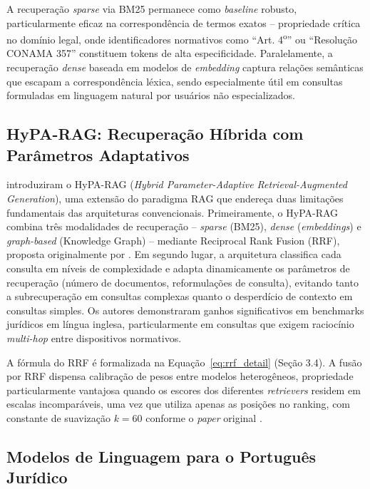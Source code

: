 \documentclass[12pt]{article}
\begin{document}
A recuperação \textit{sparse} via BM25 \cite{robertson:2009} permanece como \textit{baseline} robusto, particularmente eficaz na correspondência de termos exatos -- propriedade crítica no domínio legal, onde identificadores normativos como ``Art. 4\textsuperscript{o}'' ou ``Resolução CONAMA 357'' constituem tokens de alta especificidade. Paralelamente, a recuperação \textit{dense} baseada em modelos de \textit{embedding} captura relações semânticas que escapam a correspondência léxica, sendo especialmente útil em consultas formuladas em linguagem natural por usuários não especializados.

\subsection{HyPA-RAG: Recuperação Híbrida com Parâmetros Adaptativos}

\cite{kalra:2024} introduziram o HyPA-RAG (\textit{Hybrid Parameter-Adaptive Retrieval-Augmented Generation}), uma extensão do paradigma RAG que endereça duas limitações fundamentais das arquiteturas convencionais. Primeiramente, o HyPA-RAG combina três modalidades de recuperação -- \textit{sparse} (BM25), \textit{dense} (\textit{embeddings}) e \textit{graph-based} (Knowledge Graph) -- mediante Reciprocal Rank Fusion (RRF), proposta originalmente por \cite{cormack:2009}. Em segundo lugar, a arquitetura classifica cada consulta em níveis de complexidade e adapta dinamicamente os parâmetros de recuperação (número de documentos, reformulações de consulta), evitando tanto a subrecuperação em consultas complexas quanto o desperdício de contexto em consultas simples. Os autores demonstraram ganhos significativos em benchmarks jurídicos em língua inglesa, particularmente em consultas que exigem raciocínio \textit{multi-hop} entre dispositivos normativos.

A fórmula do RRF é formalizada na Equação~\ref{eq:rrf_detail} (Seção 3.4). A fusão por RRF dispensa calibração de pesos entre modelos heterogêneos, propriedade particularmente vantajosa quando os escores dos diferentes \textit{retrievers} residem em escalas incomparáveis, uma vez que utiliza apenas as posições no ranking, com constante de suavização $k = 60$ conforme o \textit{paper} original \cite{cormack:2009}.

\subsection{Modelos de Linguagem para o Português Jurídico}
\end{document}
